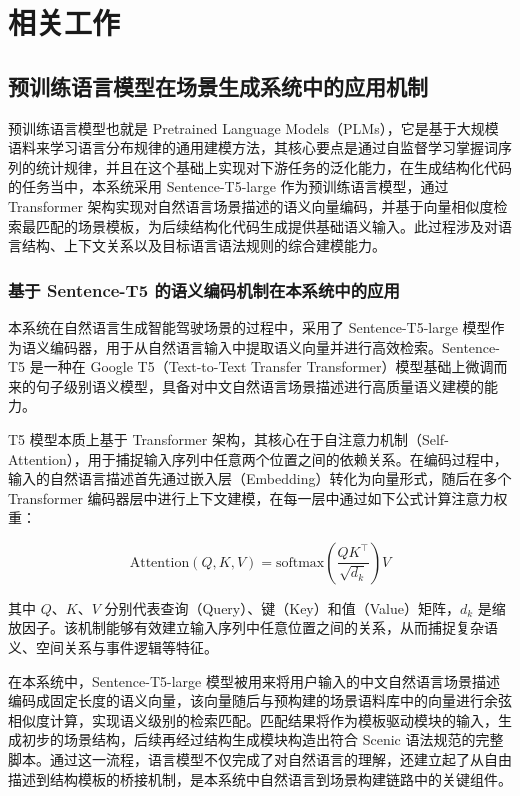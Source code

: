 \chapter{相关工作}

\section{预训练语言模型在场景生成系统中的应用机制}

预训练语言模型也就是 Pretrained Language Models（PLMs），它是基于大规模语料来学习语言分布规律的通用建模方法，其核心要点是通过自监督学习掌握词序列的统计规律，并且在这个基础上实现对下游任务的泛化能力，在生成结构化代码的任务当中，本系统采用 Sentence-T5-large 作为预训练语言模型，通过 Transformer 架构实现对自然语言场景描述的语义向量编码，并基于向量相似度检索最匹配的场景模板，为后续结构化代码生成提供基础语义输入。此过程涉及对语言结构、上下文关系以及目标语言语法规则的综合建模能力。

\subsection{基于 Sentence-T5 的语义编码机制在本系统中的应用}

本系统在自然语言生成智能驾驶场景的过程中，采用了 Sentence-T5-large 模型作为语义编码器，用于从自然语言输入中提取语义向量并进行高效检索。Sentence-T5 是一种在 Google T5（Text-to-Text Transfer Transformer）模型基础上微调而来的句子级别语义模型，具备对中文自然语言场景描述进行高质量语义建模的能力。

T5 模型本质上基于 Transformer 架构，其核心在于自注意力机制（Self-Attention），用于捕捉输入序列中任意两个位置之间的依赖关系。在编码过程中，输入的自然语言描述首先通过嵌入层（Embedding）转化为向量形式，随后在多个 Transformer 编码器层中进行上下文建模，在每一层中通过如下公式计算注意力权重：

\begin{equation}
	\text{Attention}(Q, K, V) = \text{softmax}\left( \frac{QK^\top}{\sqrt{d_k}} \right)V
\end{equation}

其中 $Q$、$K$、$V$ 分别代表查询（Query）、键（Key）和值（Value）矩阵，$d_k$ 是缩放因子。该机制能够有效建立输入序列中任意位置之间的关系，从而捕捉复杂语义、空间关系与事件逻辑等特征。

在本系统中，Sentence-T5-large 模型被用来将用户输入的中文自然语言场景描述编码成固定长度的语义向量，该向量随后与预构建的场景语料库中的向量进行余弦相似度计算，实现语义级别的检索匹配。匹配结果将作为模板驱动模块的输入，生成初步的场景结构，后续再经过结构生成模块构造出符合 Scenic 语法规范的完整脚本。通过这一流程，语言模型不仅完成了对自然语言的理解，还建立起了从自由描述到结构模板的桥接机制，是本系统中自然语言到场景构建链路中的关键组件。



